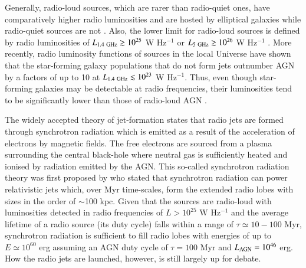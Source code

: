 Generally, radio-loud sources, which are rarer than radio-quiet ones, have comparatively higher radio luminosities and are hosted by elliptical galaxies \citep{Padovani1993} while radio-quiet sources are not \citep{Wilson1995}. Also, the lower limit for radio-loud sources is defined by radio luminosities of $L_{1.4~\rm GHz} \gtrsim 10^{25}$ W Hz$^{-1}$ or $L_{5~\rm GHz} \gtrsim 10^{26}$ W Hz$^{-1}$ \citep{Miller1990}. More recently, radio luminosity functions of sources in the local Universe have shown that the star-forming galaxy populations that do not form jets outnumber AGN by a factors of up to 10 at $L_{1.4~\rm GHz} \lesssim 10^{23}$ W Hz$^{-1}.$ Thus, even though star-forming galaxies may be detectable at radio frequencies, their luminosities tend to be significantly lower than those of radio-loud AGN \citep{Best2005a}. 

The widely accepted theory of jet-formation states that radio jets are formed through synchrotron radiation which is emitted as a result of the acceleration of electrons by magnetic fields. The free electrons are sourced from a plasma surrounding the central black-hole where neutral gas is sufficiently heated and ionised by radiation emitted by the AGN. This so-called synchrotron radiation theory was first proposed by \citet{Shklovskii1953} who stated that synchrotron radiation can power relativistic jets which, over Myr time-scales, form the extended radio lobes with sizes in the order of $\sim$100 kpc. Given that the sources are radio-loud with luminosities detected in radio frequencies of $L > 10^{25}$ W Hz$^{-1}$ and the average lifetime of a radio source (its duty cycle) falls within a range of $\tau \simeq 10-100$ Myr, synchrotron radiation is sufficient to fill radio lobes with energies of up to $E \simeq 10^{60}$ erg assuming an AGN duty cycle of $\tau = 100$ Myr and $L_{\rm AGN} = 10^{46}$ erg. How the radio jets are launched, however, is still largely up for debate.

